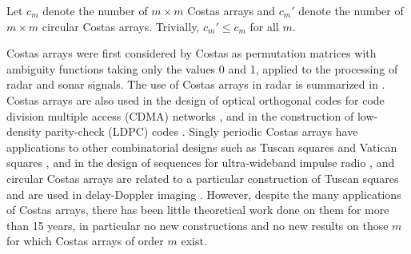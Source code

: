 \documentclass[10pt]{amsart}
\begin{document}
Let $c_m$ denote the number of $m \times
m$ Costas arrays and $c_m'$ denote the number of $m \times m$
circular Costas arrays. Trivially, $c_m' \leq c_m$ for all $m$.


Costas arrays were first considered by Costas \cite{costas1975} as
permutation matrices with ambiguity functions taking only the
values 0 and 1, applied to the processing of radar and
sonar signals. The use of Costas arrays in radar is summarized in
\cite[\S 5.2]{levanon}. %
Costas arrays are also used in the design of optical orthogonal
codes for code division multiple access (CDMA) networks
\cite{maric1995}, and in the construction of low-density
parity-check (LDPC) codes \cite{chae2004}. Singly periodic Costas
arrays have applications to other combinatorial designs such as
Tuscan squares \cite{MR992291} and Vatican squares
\cite{MR1992965}, and in the design of sequences for
ultra-wideband impulse radio \cite{chu2004}, and circular Costas
arrays are related to a particular construction of Tuscan squares
\cite{periodicity} and are used in delay-Doppler imaging
\cite{MR1665811}. However, despite the many applications of Costas
arrays, there has been little theoretical work done on them for
more than 15 years, in particular no new constructions and no new
results on those $m$ for which Costas arrays of order $m$ exist.
\end{document}
